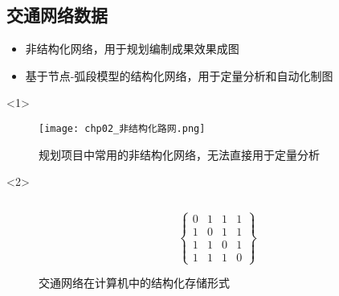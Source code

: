 \subsection{交通网络数据}
\begin{frame}[t]{\subsecname}
\begin{itemize}
\item<1-> 非结构化网络，用于规划编制成果效果成图
\item<2-> 基于节点-弧段模型的结构化网络，用于定量分析和自动化制图
\end{itemize}

\begin{overlayarea}{\textwidth}{\textheight}
  \begin{onlyenv}<1>
\begin{figure}
  \centering
  \texttt{[image: chp02\_非结构化路网.png]}
  \caption{规划项目中常用的非结构化网络，无法直接用于定量分析}
\end{figure}
  \end{onlyenv}

  \begin{onlyenv}<2>
\begin{figure}
\begin{columns}
  \begin{column}{.5\textwidth}\centering    
  \end{column}

  \begin{column}{.5\textwidth}\centering \xiaosihao
$
 \left\{
 \begin{matrix}
   0 & 1 & 1 & 1 \\
   1 & 0 & 1 & 1 \\
   1 & 1 & 0 & 1 \\
   1 & 1 & 1 & 0  
  \end{matrix}
  \right\} 
$
  \end{column}
\end{columns}
\caption{交通网络在计算机中的结构化存储形式}
\end{figure}
  \end{onlyenv}
\end{overlayarea}
\end{frame}

